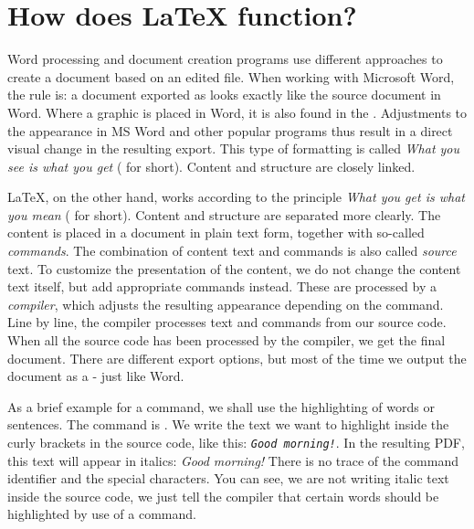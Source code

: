\chapter{How does \LaTeX{} function?}
\label{sec:basic-functionality}


Word processing and document creation programs use different approaches to create a document based on an edited file.
When working with Microsoft Word, the rule is: a document exported as  looks exactly like the source document in Word. Where a graphic is placed in Word, it is also found in the . Adjustments to the appearance in MS Word and other popular programs thus result in a direct visual change in the resulting export. This type of formatting is called \emph{What you see is what you get} ( for short). Content and structure are closely linked.

\LaTeX{}, on the other hand, works according to the principle \emph{What you get is what you mean} ( for short). Content and structure are separated more clearly.
The content is placed in a document in plain text form, together with so-called \emph{commands}. The combination of content text and commands is also called \emph{source} text. To customize the presentation of the content, we do not change the content text itself, but add appropriate commands instead. These are processed by a \emph{compiler}, which adjusts the resulting appearance depending on the command. Line by line, the compiler processes text and commands from our source code. When all the source code has been processed by the compiler, we get the final document. There are different export options, but most of the time we output the document as a  - just like Word.


As a brief example for a command, we shall use the highlighting of words or sentences. The command is \texttt{\emph{}}. We write the text we want to highlight inside the curly brackets in the source code, like this: \texttt{\emph{Good morning!}}. In the resulting PDF, this text will appear in italics: \emph{Good morning!} There is no trace of the command identifier and the special characters. You can see, we are not writing italic text inside the source code, we just tell the compiler that certain words should be highlighted by use of a command.

